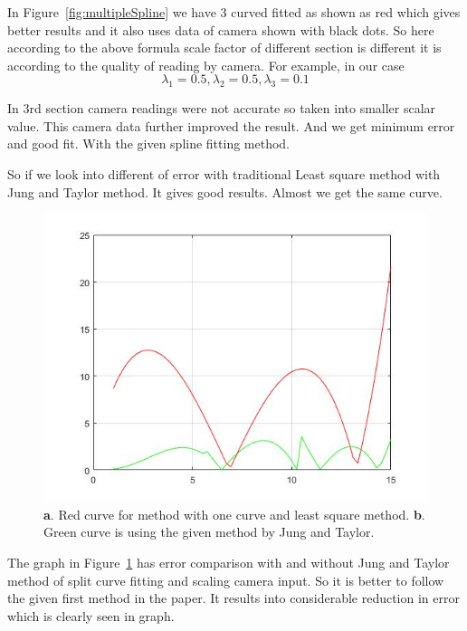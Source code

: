 In Figure~\ref{fig:multipleSpline} we have 3 curved fitted as shown as red which gives better results and it also uses data of camera shown with black dots. So here according to the above formula scale factor of different section is different it is according to the quality of reading by camera.
For example, in our case 
\begin{equation}
\lambda_1=0.5 ,\lambda_2=0.5 ,\lambda_3=0.1
\end{equation}

In 3rd section camera readings were not accurate so taken into smaller scalar value. This camera data further improved the result. And we get minimum error and good fit. With the given spline fitting method.

So if we look into different of error with traditional Least square method with Jung and Taylor method. It gives good results. Almost we get the same curve.

\begin{figure}[!htb]
\includegraphics[width=\textwidth]{./figures/ErrorC.jpg}
\caption{\textbf{a}. Red curve for method with one curve and least square method. 
\textbf{b}. Green curve is using the given method by Jung and Taylor.}
\label{fig:errorc1}
\end{figure}

The graph in Figure~\ref{fig:errorc1} has error comparison with and without Jung and Taylor method of split curve fitting and scaling camera input.
So it is better to follow the given first method in the paper. It results into considerable reduction in error which is clearly seen in graph.


